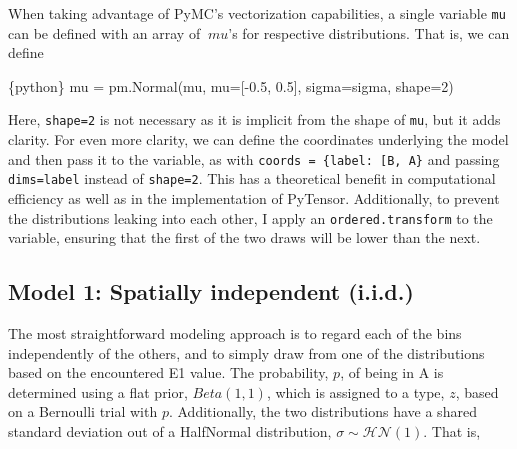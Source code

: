 \documentclass[
  10pt,
  a4paper,
  openany]{scrbook}
\newenvironment{Shaded}{\begin{snugshade}}{\end{snugshade}}
\newcommand{\DecValTok}[1]{\textcolor[rgb]{0.69,0.50,0.00}{#1}}
\newcommand{\FloatTok}[1]{\textcolor[rgb]{0.69,0.50,0.00}{#1}}
\newcommand{\InformationTok}[1]{\textcolor[rgb]{0.69,0.50,0.00}{#1}}
\newcommand{\NormalTok}[1]{\textcolor[rgb]{0.12,0.11,0.11}{#1}}
\newcommand{\OperatorTok}[1]{\textcolor[rgb]{0.12,0.11,0.11}{#1}}
\newcommand{\StringTok}[1]{\textcolor[rgb]{0.75,0.01,0.01}{#1}}
\renewenvironment{Shaded}
{
  \vspace{-0.5em} %
  \begin{snugshade} %
  \small %
}
{
  \end{snugshade} %
  \vspace{-1em} %
}
\begin{document}
When taking advantage of PyMC's vectorization capabilities, a single
variable \texttt{mu} can be defined with an array of \(\ mu\)'s for
respective distributions. That is, we can define

\begin{Shaded}
\begin{Highlighting}[]
\InformationTok{\textasciigrave{}\textasciigrave{}\textasciigrave{}\{python\}}
\NormalTok{mu }\OperatorTok{=}\NormalTok{ pm.Normal(}\StringTok{\textquotesingle{}mu\textquotesingle{}}\NormalTok{, mu}\OperatorTok{=}\NormalTok{[}\OperatorTok{{-}}\FloatTok{0.5}\NormalTok{, }\FloatTok{0.5}\NormalTok{], sigma}\OperatorTok{=}\NormalTok{sigma, shape}\OperatorTok{=}\DecValTok{2}\NormalTok{)}
\InformationTok{\textasciigrave{}\textasciigrave{}\textasciigrave{}}
\end{Highlighting}
\end{Shaded}

Here, \texttt{shape=2} is not necessary as it is implicit from the shape
of \texttt{mu}, but it adds clarity. For even more clarity, we can
define the coordinates underlying the model and then pass it to the
variable, as with
\texttt{coords\ =\ \{\textquotesingle{}label\textquotesingle{}:\ {[}\textquotesingle{}B\textquotesingle{},\ \textquotesingle{}A\textquotesingle{}{]}\}}
and passing \texttt{dims=label} instead of \texttt{shape=2}. This has a
theoretical benefit in computational efficiency as well as in the
implementation of PyTensor. Additionally, to prevent the distributions
leaking into each other, I apply an \texttt{ordered.transform} to the
variable, ensuring that the first of the two draws will be lower than
the next.

\subsection{Model 1: Spatially independent
(i.i.d.)}\label{model-1-spatially-independent-i.i.d.}

The most straightforward modeling approach is to regard each of the bins
independently of the others, and to simply draw from one of the
distributions based on the encountered E1 value. The probability, \(p\),
of being in A is determined using a flat prior, \(Beta(1,1)\), which is
assigned to a type, \(z\), based on a Bernoulli trial with \(p\).
Additionally, the two distributions have a shared standard deviation out
of a HalfNormal distribution, \(\sigma \sim \mathcal{HN}(1)\). That is,
\end{document}
